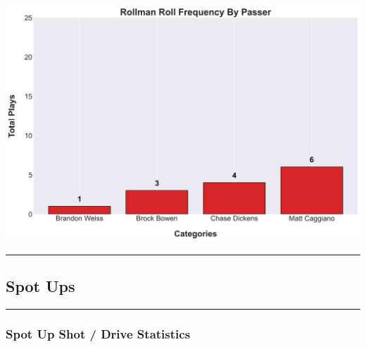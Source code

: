 \documentclass[a4paper,12pt]{article}
\begin{document}
\begin{table}[H]
{\begin{minipage}[t]{0.6\textwidth}
{\begin{tabular}
                
            

            \bottomrule
        \end{tabular}
        } %
    \end{minipage}
    } %
    \hfill %
    \begin{minipage}[c]{0.35\textwidth} %
        \flushright
        \includegraphics[width=\textwidth, height=.14\textheight]{images/Rollman_RollPlayer_Freq.png} %
    \end{minipage}
\end{table}

\vspace{-1em} %
\hrule height 1pt width 1\textwidth %
\vspace{1em} %


\subsection{Spot Ups}

\vspace{1em} %
\hrule height 1pt width 1\textwidth %
\vspace{1em} %

\subsubsection{Spot Up Shot / Drive Statistics}
\end{document}
